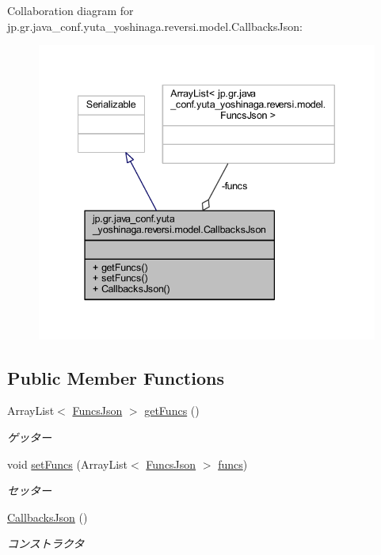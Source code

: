 Collaboration diagram for jp.\+gr.\+java\+\_\+conf.\+yuta\+\_\+yoshinaga.\+reversi.\+model.\+Callbacks\+Json\+:
\nopagebreak
\begin{figure}[H]
\begin{center}
\leavevmode
\includegraphics[width=340pt]{classjp_1_1gr_1_1java__conf_1_1yuta__yoshinaga_1_1reversi_1_1model_1_1_callbacks_json__coll__graph}
\end{center}
\end{figure}
\subsection*{Public Member Functions}
\begin{DoxyCompactItemize}
\item 
Array\+List$<$ \hyperlink{classjp_1_1gr_1_1java__conf_1_1yuta__yoshinaga_1_1reversi_1_1model_1_1_funcs_json}{Funcs\+Json} $>$ \hyperlink{classjp_1_1gr_1_1java__conf_1_1yuta__yoshinaga_1_1reversi_1_1model_1_1_callbacks_json_af9a62a3dbe6416793c01d7a0f69da2b1}{get\+Funcs} ()
\begin{DoxyCompactList}\small\item\em ゲッター \end{DoxyCompactList}\item 
void \hyperlink{classjp_1_1gr_1_1java__conf_1_1yuta__yoshinaga_1_1reversi_1_1model_1_1_callbacks_json_a6de1fc00c131167b4fe6231a660bdb6e}{set\+Funcs} (Array\+List$<$ \hyperlink{classjp_1_1gr_1_1java__conf_1_1yuta__yoshinaga_1_1reversi_1_1model_1_1_funcs_json}{Funcs\+Json} $>$ \hyperlink{classjp_1_1gr_1_1java__conf_1_1yuta__yoshinaga_1_1reversi_1_1model_1_1_callbacks_json_acbc23906e4e1cd6ff59a46ee2d7e1a85}{funcs})
\begin{DoxyCompactList}\small\item\em セッター \end{DoxyCompactList}\item 
\hyperlink{classjp_1_1gr_1_1java__conf_1_1yuta__yoshinaga_1_1reversi_1_1model_1_1_callbacks_json_acdc36faba755660c46ab3d1641d18e67}{Callbacks\+Json} ()
\begin{DoxyCompactList}\small\item\em コンストラクタ \end{DoxyCompactList}\end{DoxyCompactItemize}
